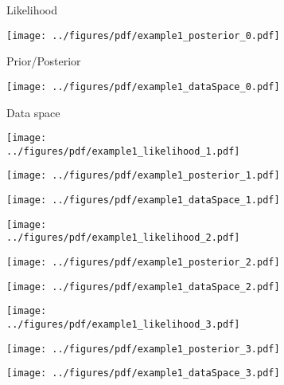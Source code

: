 \begin{figure}[H]

\begin{subfigure}[t]{0.32\textwidth} 
\caption*{Likelihood} 
\end{subfigure}
\begin{subfigure}[t]{0.32\textwidth}
\caption*{Prior/Posterior} 
\texttt{[image: ../figures/pdf/example1\_posterior\_0.pdf]} 
\end{subfigure}
\begin{subfigure}[t]{0.32\textwidth}
\caption*{Data space} 
\texttt{[image: ../figures/pdf/example1\_dataSpace\_0.pdf]} 
\end{subfigure}


\begin{subfigure}[c]{0.32\textwidth}
\texttt{[image: ../figures/pdf/example1\_likelihood\_1.pdf]} 
\end{subfigure}
\begin{subfigure}[c]{0.32\textwidth}
\texttt{[image: ../figures/pdf/example1\_posterior\_1.pdf]} 
\end{subfigure}
\begin{subfigure}[c]{0.32\textwidth}
\texttt{[image: ../figures/pdf/example1\_dataSpace\_1.pdf]} 
\end{subfigure}

\begin{subfigure}[c]{0.32\textwidth}
\texttt{[image: ../figures/pdf/example1\_likelihood\_2.pdf]} 
\end{subfigure}
\begin{subfigure}[c]{0.32\textwidth}
\texttt{[image: ../figures/pdf/example1\_posterior\_2.pdf]} 
\end{subfigure}
\begin{subfigure}[c]{0.32\textwidth}
\texttt{[image: ../figures/pdf/example1\_dataSpace\_2.pdf]} 
\end{subfigure}

\begin{subfigure}[c]{0.32\textwidth}
\texttt{[image: ../figures/pdf/example1\_likelihood\_3.pdf]} 
\end{subfigure}
\begin{subfigure}[c]{0.32\textwidth}
\texttt{[image: ../figures/pdf/example1\_posterior\_3.pdf]} 
\end{subfigure}
\begin{subfigure}[c]{0.32\textwidth}
\texttt{[image: ../figures/pdf/example1\_dataSpace\_3.pdf]} 
\end{subfigure}


\end{figure}
